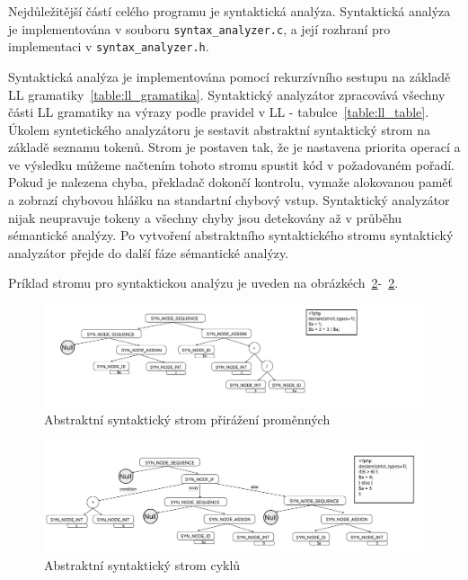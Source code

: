 \documentclass[a4paper, 11pt]{article}
\begin{document}
	Nejdůležitější částí celého programu je syntaktická analýza. Syntaktická analýza je implementována v souboru
	\texttt{syntax\_analyzer.c}, a její rozhraní pro implementaci v \texttt{syntax\_analyzer.h}.

	Syntaktická analýza je implementována pomocí rekurzívního sestupu na základě LL gramatiky~\ref{table:ll_gramatika}. Syntaktický
	analyzátor zpracovává všechny části LL gramatiky na výrazy podle pravidel v LL - tabulce~\ref{table:ll_table}. Úkolem
	syntetického analyzátoru je sestavit abstraktní syntaktický strom na základě seznamu tokenů. Strom je postaven
	tak, že je nastavena priorita operací a ve výsledku můžeme načtením tohoto stromu spustit kód v
	požadovaném pořadí. Pokud je nalezena chyba, překladač dokončí kontrolu, vymaže alokovanou paměť
	a zobrazí chybovou hlášku na standartní chybový vstup. Syntaktický analyzátor nijak neupravuje tokeny a všechny
	chyby jsou detekovány až v průběhu sémantické analýzy. Po vytvoření abstraktního syntaktického stromu
	syntaktický analyzátor přejde do další fáze sémantické analýzy.

	Príklad stromu pro syntaktickou analýzu je uveden na obrázkéch~\ref{figure:ast_example}-~\ref{figure:ast_example}.

	\newpage

	\begin{figure}[!ht]
		\centering
		\includegraphics[width=1\linewidth]{assign.pdf}
		\caption{Abstraktní syntaktický strom přirážení proměnných}
		\label{figure:ast_example}
	\end{figure}

    \begin{figure}[!ht]
		\centering
		\includegraphics[width=1\linewidth]{if.pdf}
		\caption{Abstraktní syntaktický strom cyklů}
		\label{figure:ast_example}
	\end{figure}
\end{document}
